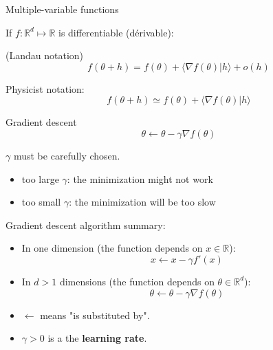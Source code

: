 \documentclass[usenames,dvipsnames,french]{beamer}
\begin{document}
\begin{frame}{Multiple-variable functions}

    If $f: \mathbb{R}^d \mapsto \mathbb{R} $ is differentiable (dérivable):

    (Landau notation)
    \begin{equation}
        f(\theta+h) = f(\theta) + \langle \nabla f(\theta) | h\rangle + o(h)
    \end{equation}


    Physicist notation:
    \begin{equation}
        f(\theta+h) \simeq f(\theta) + \langle \nabla f(\theta) | h\rangle
    \end{equation}

\end{frame}

\begin{frame}{Gradient descent}
\begin{equation}
	\theta\leftarrow \theta-\gamma \nabla f(\theta)
\end{equation}

$\gamma$ must be carefully chosen.

\begin{itemize}
    \item too large $\gamma$: the minimization might not work
    \item too small $\gamma$: the minimization will be too slow
\end{itemize}
\end{frame}



\begin{frame}{Gradient descent algorithm summary:}
    \begin{itemize}
	\item In one dimension (the function depends on $x\in \mathbb{R}$):
            \begin{equation}
                x \leftarrow x-\gamma f'(x)
            \end{equation}
	\item In $d>1$ dimensions (the function depends on $\theta \in \mathbb{R}^d$):
   \begin{equation}
       \theta \leftarrow \theta - \gamma \nabla f(\theta)
   \end{equation} 
		\item $\leftarrow$ means "is substituted by".
		\item $\gamma>0$ is a the \textbf{learning rate}.
    \end{itemize}
\end{frame}
\end{document}
